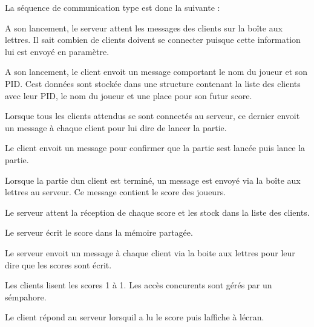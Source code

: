 La séquence de communication type est donc la suivante \+:
\begin{DoxyEnumerate}
\item A son lancement, le serveur attent les messages des clients sur la boîte aux lettres. Il sait combien de clients doivent se connecter puisque cette information lui est envoyé en paramètre.
\end{DoxyEnumerate}
\begin{DoxyEnumerate}
\item A son lancement, le client envoit un message comportant le nom du joueur et son P\+ID. C\textquotesingle{}est données sont stockée dans une structure contenant la liste des clients avec leur P\+ID, le nom du joueur et une place pour son futur score.
\end{DoxyEnumerate}
\begin{DoxyEnumerate}
\item Lorsque tous les clients attendus se sont connectés au serveur, ce dernier envoit un message à chaque client pour lui dire de lancer la partie.
\end{DoxyEnumerate}
\begin{DoxyEnumerate}
\item Le client envoit un message pour confirmer que la partie s\textquotesingle{}est lancée puis lance la partie.
\end{DoxyEnumerate}
\begin{DoxyEnumerate}
\item Lorsque la partie d\textquotesingle{}un client est terminé, un message est envoyé via la boîte aux lettres au serveur. Ce message contient le score des joueurs.
\end{DoxyEnumerate}
\begin{DoxyEnumerate}
\item Le serveur attent la réception de chaque score et les stock dans la liste des clients.
\end{DoxyEnumerate}
\begin{DoxyEnumerate}
\item Le serveur écrit le score dans la mémoire partagée.
\end{DoxyEnumerate}
\begin{DoxyEnumerate}
\item Le serveur envoit un message à chaque client via la boite aux lettres pour leur dire que les scores sont écrit.
\end{DoxyEnumerate}
\begin{DoxyEnumerate}
\item Les clients lisent les scores 1 à 1. Les accès concurents sont gérés par un sémpahore.
\end{DoxyEnumerate}
\begin{DoxyEnumerate}
\item Le client répond au serveur lorsqu\textquotesingle{}il a lu le score puis l\textquotesingle{}affiche à l\textquotesingle{}écran.
\end{DoxyEnumerate}

